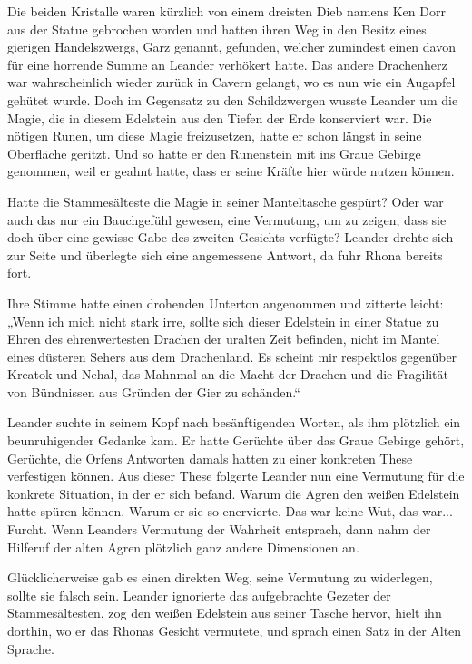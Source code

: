 \documentclass[10pt, a4paper, oneside]{book}
\begin{document}
Die beiden Kristalle waren kürzlich von einem dreisten Dieb namens Ken Dorr aus der Statue gebrochen worden und hatten ihren Weg in den Besitz eines gierigen Handelszwergs, Garz genannt, gefunden, welcher zumindest einen davon für eine horrende Summe an Leander verhökert hatte. Das andere Drachenherz war wahrscheinlich wieder zurück in Cavern gelangt, wo es nun wie ein Augapfel gehütet wurde. Doch im Gegensatz zu den Schildzwergen wusste Leander um die Magie, die in diesem Edelstein aus den Tiefen der Erde konserviert war. Die nötigen Runen, um diese Magie freizusetzen, hatte er schon längst in seine Oberfläche geritzt. Und so hatte er den Runenstein mit ins Graue Gebirge genommen, weil er geahnt hatte, dass er seine Kräfte hier würde nutzen können.

Hatte die Stammesälteste die Magie in seiner Manteltasche gespürt? Oder war auch das nur ein Bauchgefühl gewesen, eine Vermutung, um zu zeigen, dass sie doch über eine gewisse Gabe des zweiten Gesichts verfügte? Leander drehte sich zur Seite und überlegte sich eine angemessene Antwort, da fuhr Rhona bereits fort.

Ihre Stimme hatte einen drohenden Unterton angenommen und zitterte leicht: „Wenn ich mich nicht stark irre, sollte sich dieser Edelstein in einer Statue zu Ehren des ehrenwertesten Drachen der uralten Zeit befinden, nicht im Mantel eines düsteren Sehers aus dem Drachenland. Es scheint mir respektlos gegenüber Kreatok und Nehal, das Mahnmal an die Macht der Drachen und die Fragilität von Bündnissen aus Gründen der Gier zu schänden.“

Leander suchte in seinem Kopf nach besänftigenden Worten, als ihm plötzlich ein beunruhigender Gedanke kam. Er hatte Gerüchte über das Graue Gebirge gehört, Gerüchte, die Orfens Antworten damals hatten zu einer konkreten These verfestigen können. Aus dieser These folgerte Leander nun eine Vermutung für die konkrete Situation, in der er sich befand. Warum die Agren den weißen Edelstein hatte spüren können. Warum er sie so enervierte. Das war keine Wut, das war... Furcht. Wenn Leanders Vermutung der Wahrheit entsprach, dann nahm der Hilferuf der alten Agren plötzlich ganz andere Dimensionen an.

Glücklicherweise gab es einen direkten Weg, seine Vermutung zu widerlegen, sollte sie falsch sein. Leander ignorierte das aufgebrachte Gezeter der Stammesältesten, zog den weißen Edelstein aus seiner Tasche hervor, hielt ihn dorthin, wo er das Rhonas Gesicht vermutete, und sprach einen Satz in der Alten Sprache.
\end{document}
